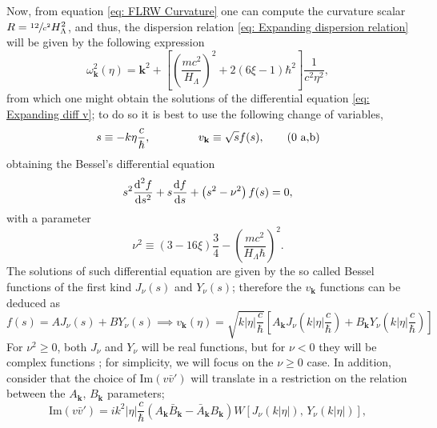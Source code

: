 Now, from equation \ref{eq: FLRW Curvature} one can compute the curvature scalar $R=\sfrac{12}{c^2}H_\Lambda^2$, and thus, the dispersion relation \ref{eq: Expanding dispersion relation} will be given by the following expression
\begin{equation}\label{eq: de Sitter dispersion relation}
	\omega^2_\mathbf{k}(\eta)=\mathbf{k}^2+\left[\left(\frac{mc^2}{H_\Lambda}\right)^2+2\left(6\xi-1\right)\hbar^2\right]\frac{1}{c^2\eta^2},
\end{equation}
from which one might obtain the solutions of the differential equation \ref{eq: Expanding diff v}; to do so it is best to use the following change of variables,
\begin{subequations}
	\begin{gather}
		s\equiv -k\eta\frac{c}{\hbar},\hspace{1.5cm}v_\mathbf{k}\equiv \sqrt{s}f(s),\tag{\theequation \,\,a,b}
	\end{gather}
\end{subequations}
obtaining the Bessel's differential equation
\begin{equation}
	s^2\frac{\text{d}^2f}{\text{d} s^2}+s\frac{\text{d} f}{\text{d} s}+\left(s^2-\nu^2\right)f(s)=0,
\end{equation}
with a parameter
\begin{equation}
	\nu^2\equiv \left(3-16\xi\right)\frac{3}{4}-\left(\frac{mc^2}{H_\Lambda\hbar }\right)^2.
\end{equation}
The solutions of such differential equation are given by the so called Bessel functions of the first kind $J_\nu(s)$ and $Y_\nu(s)$; therefore the $v_\mathbf{k}$ functions can be deduced as
\begin{equation}\label{eq: de Sitter general v}
	f(s)=AJ_\nu(s)+BY_\nu(s)\implies v_\mathbf{k}(\eta)=\sqrt{k|\eta|\frac{c}{\hbar}}\left[A_\mathbf{k}J_\nu(k|\eta|\frac{c}{\hbar})+B_\mathbf{k}Y_\nu(k|\eta|\frac{c}{\hbar})\right]
\end{equation}
For $\nu^2\geq 0$, both $J_\nu$ and $Y_\nu$ will be real functions, but for $\nu<0$ they will be complex functions \cite{BesselComplex}; for simplicity, we will focus on the $\nu\geq 0$ case. In addition, consider that the choice of $\text{Im}(v\bar v')$ will translate in a restriction on the relation between the  $A_\mathbf{k},\,B_\mathbf{k}$ parameters;
\begin{equation}
	\text{Im}\left(v\bar{v}'\right)=ik^2|\eta|\frac{c}{\hbar}\left(A_\mathbf{k}\bar{B}_\mathbf{k}-\bar{A}_\mathbf{k}B_\mathbf{k}\right)W\left[J_\nu\left(k|\eta|\right),\,Y_\nu\left(k|\eta|\right)\right],
\end{equation}
